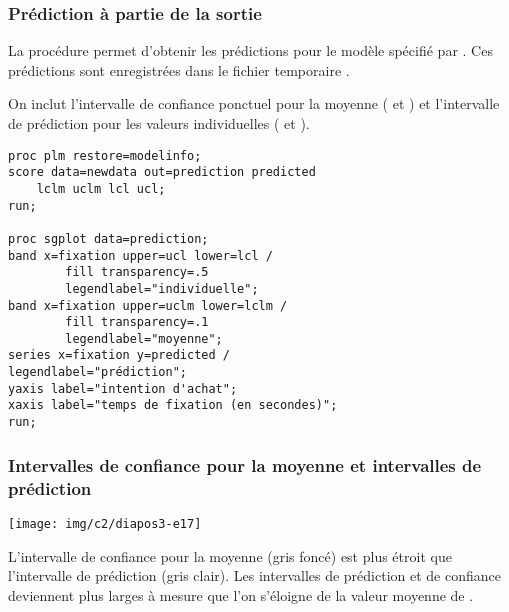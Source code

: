 \documentclass[xcolor={dvipsnames}]{beamer}
\begin{document}
\begin{frame}
\frametitle{Prédiction à partie de la sortie}
\bi 
 \item La procédure  permet d'obtenir les prédictions pour le modèle spécifié par  . Ces prédictions sont enregistrées dans le fichier temporaire .
\item On inclut l'intervalle de confiance ponctuel pour la moyenne ( et ) et l'intervalle de prédiction pour les valeurs individuelles ( et ).
\ei
\end{frame}

\begin{frame}[fragile]

\begin{tcolorbox}[colback=white, colframe=hecblue, title=Code \SASlang pour obtenir les prédictions avec \code{plm} ]
{\small 
\begin{verbatim}
proc plm restore=modelinfo; 
score data=newdata out=prediction predicted 
    lclm uclm lcl ucl; 
run;

proc sgplot data=prediction;
band x=fixation upper=ucl lower=lcl / 
        fill transparency=.5 
        legendlabel="individuelle";
band x=fixation upper=uclm lower=lclm / 
        fill transparency=.1 
        legendlabel="moyenne";
series x=fixation y=predicted / 
legendlabel="prédiction";
yaxis label="intention d'achat";
xaxis label="temps de fixation (en secondes)";
run;
\end{verbatim}
}
\end{tcolorbox}
\end{frame}


\begin{frame}[fragile]
\frametitle{Intervalles de confiance pour la moyenne et intervalles de prédiction}
\begin{center}
\texttt{[image: img/c2/diapos3-e17]}
\end{center}
{\footnotesize L'intervalle de confiance pour la moyenne (gris foncé) est plus étroit que l'intervalle de prédiction (gris clair). Les intervalles de prédiction et de confiance deviennent plus larges à mesure que l'on s'éloigne de la valeur moyenne de .

}
\end{frame}
\end{document}
